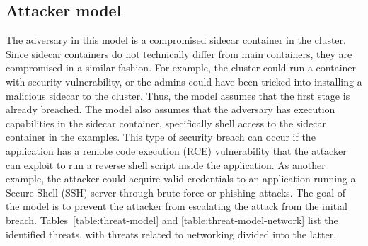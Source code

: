 \documentclass[english, 12pt, a4paper, sci, utf8, a-2b, online]{aaltothesis}
\begin{document}
\subsection{Attacker model}

The adversary in this model is a compromised sidecar container in the cluster.
Since sidecar containers do not technically differ from main containers, they are compromised in a similar fashion.
For example, the cluster could run a container with security vulnerability, or the admins could have been tricked into installing a malicious sidecar to the cluster.
Thus, the model assumes that the first stage is already breached.
The model also assumes that the adversary has execution capabilities in the sidecar container, specifically shell access to the sidecar container in the examples.
This type of security breach can occur if the application has a remote code execution (RCE) vulnerability that the attacker can exploit to run a reverse shell script inside the application.
As another example, the attacker could acquire valid credentials to an application running a Secure Shell (SSH) server through brute-force or phishing attacks.
The goal of the model is to prevent the attacker from escalating the attack from the initial breach.
Tables~\ref{table:threat-model} and \ref{table:threat-model-network} list the identified threats, with threats related to networking divided into the latter.
\end{document}
